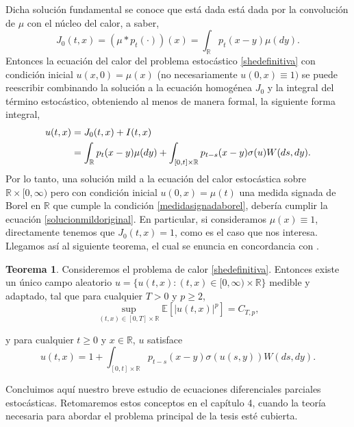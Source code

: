 \documentclass[letterpaper,twoside,12pt]{book}
\newcommand{\R}{\mathbb{R}}
\newcommand{\E}{\mathbb{E}}
\newcommand{\1}{\mathds{1}}
\newcommand{\abs}[1]{\left\lvert #1 \right\rvert}
\theoremstyle{definition}
\theoremstyle{definition}
\newtheorem{teo}{Teorema}
\theoremstyle{remark}
\theoremstyle{definition}
\theoremstyle{definition}
\theoremstyle{definition}
\theoremstyle{definition}
\theoremstyle{definition}
\begin{document}
Dicha solución fundamental se conoce que está dada está dada por la convolución de $\mu$ con el núcleo del calor, a saber, 
\[
J_0(t,x)=(\mu*p_t(\cdot))(x)=\int_{\R}p_t(x-y)\mu(dy).
\]
Entonces la ecuación del calor del problema estocástico \eqref{shedefinitiva} con condición inicial $u(x,0)=\mu(x)$ (no necesariamente $u(0,x)\equiv1)$ se puede reescribir combinando la solución a la ecuación homogénea $J_0$ y la integral del término estocástico, obteniendo al menos de manera formal, la siguiente forma integral,
\begin{align}
   u(t,x)&=J_0(t,x)+I(t,x)\notag\\
   &=\int_{\R}p_t(x-y)\mu(dy)+\int_{[0,t]\times\R}p_{t-s}(x-y)\sigma(u)W(ds,dy)\label{solucionmildoriginal}.
\end{align}
Por lo tanto, una solución mild a la ecuación del calor estocástica sobre $\R\times[0,\infty)$ pero con condición inicial $u(0,x)=\mu(t)$ una medida signada de Borel en $\R$ que cumple la condición \eqref{medidasignadaborel}, debería cumplir la ecuación \eqref{solucionmildoriginal}. En particular, si consideramos $\mu(x)\equiv 1$, directamente tenemos que $J_0(t,x)=1$, como es el caso que nos interesa. Llegamos así al siguiente teorema, el cual se enuncia en concordancia con \cite[proposición 2.1]{KUZGUN202268}.

\begin{teo}\label{solucionmild}
 Consideremos el problema de calor \eqref{shedefinitiva}. Entonces existe un único campo aleatorio $u=\{u(t,x): (t,x)\in [0,\infty)\times \R\}$ medible y adaptado, tal que para cualquier $T>0$ y $p\geq2$, 
 \begin{equation}\label{cotasolucionmild}
   \sup_{(t,x)\in [0,T]\times\R}\E\left[\abs{u(t,x)}^p\right]=C_{T,p},
 \end{equation}
 
 y para cualquier $t\geq0$ y $x\in \R$, $u$ satisface
 \begin{equation}\label{eqsolucionmild}
   u(t,x)=1+\int_{[0,t]\times \R}^{}p_{t-s}(x-y)\sigma(u(s,y))W(ds,dy).
 \end{equation}
 \end{teo}
Concluimos aquí nuestro breve estudio de ecuaciones diferenciales parciales estocásticas. Retomaremos estos conceptos en el capítulo 4, cuando la teoría necesaria para abordar el problema principal de la tesis esté cubierta.
\end{document}

